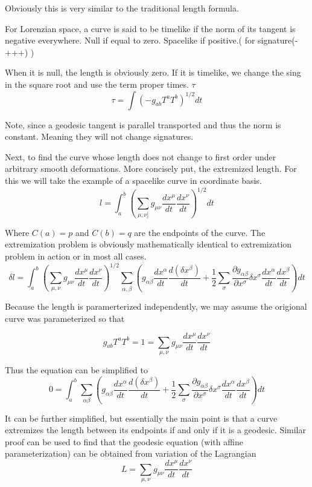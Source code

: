 Obviously this is very similar to the traditional length formula.

For Lorenzian space, a curve is said to be timelike if the norm of its tangent is negative everywhere. Null if equal to zero. Spacelike if positive.( for signature(-+++) )

When it is null, the length is obviously zero. If it is timelike, we change the sing in the square root and use the term proper times. $\tau$
\[
\tau = \int (-g_{ab}T^aT^b)^{1/2}dt
\]

Note, since a geodesic tangent is parallel transported and thus the norm is constant. Meaning they will not change signatures.

Next, to find the curve whose length does not change to first order under arbitrary smooth deformations. More concisely put, the extremized length. For this we will take the example of a spacelike curve in coordinate basis.
\[
l=\int_a^b \left(\sum_{\mu, \nu]}g_{\mu \nu}\frac{dx^\mu}{dt}\frac{dx^\nu}{dt}  \right)^{1/2} dt
\]

Where $C(a)=p$ and $C(b)=q$ are the endpoints of the curve. The extremization problem is obviously mathematically identical to extremization problem in action or in most all cases.
\[
\delta l=\int_a^b \left(\sum_{\mu, \nu}g_{\mu \nu}\frac{dx^\mu}{dt}\frac{dx^\nu}{dt}  \right)^{1/2} \sum_{\alpha, \beta} \left( g_{\alpha \beta}\frac{dx^\alpha}{dt}\frac{d(\delta x^\beta)}{dt} + \frac{1}{2} \sum_\sigma \frac{\partial g_{\alpha \beta}}{\partial x^\sigma} \delta x^\sigma \frac{dx^\alpha}{dt}\frac{dx^\beta}{dt} \right) dt
\]

Because the length is paramerterized independently, we may assume the origional curve was parameterized so that

\[
g_{ab}T^aT^b = 1 = \sum_{\mu, \nu} g_{\mu \nu} \frac{dx^\mu}{dt}\frac{dx^\nu}{dt}
\]

Thus the equation can be simplified to
\[
0 = \int_a^b \sum_{\alpha \beta} \left( g_{\alpha \beta}\frac{dx^\alpha}{dt}\frac{d(\delta x^\beta)}{dt} + \frac{1}{2} \sum_\sigma \frac{\partial g_{\alpha \beta}}{\partial x^\sigma} \delta x^\sigma \frac{dx^\alpha}{dt}\frac{dx^\beta}{dt} \right) dt
\]

It can be further simplified, but essentially the main point is that a curve extremizes the length between its endpoints if and only if it is a geodesic. Similar proof can be used to find that the geodesic equation (with affine parameterization) can be obtained from variation of the Lagrangian
\[
L= \sum_{\mu, \nu} g_{\mu \nu} \frac{dx^\mu}{dt}\frac{dx^\nu}{dt}
\]

